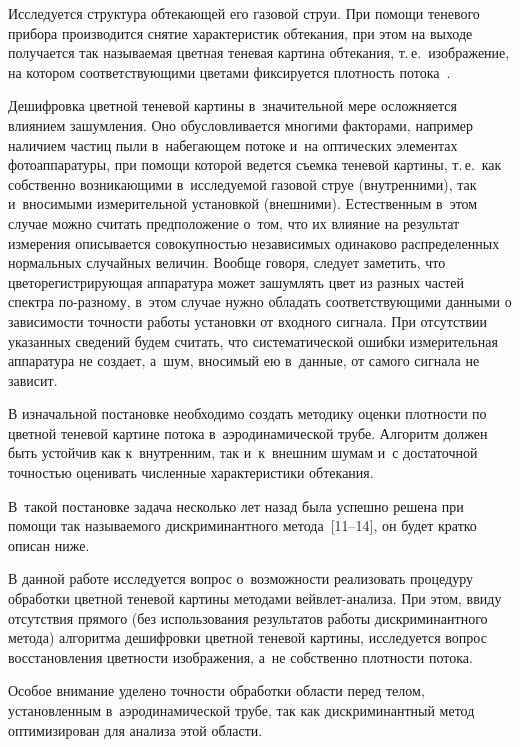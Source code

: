 \begin{multicols}{2}
Исследуется
структура обтекающей его газовой струи. При помощи теневого прибора
производится снятие характеристик обтекания, при этом на выходе
получается так называемая цветная теневая картина обтекания, т.\,е.\
изображение, на котором соответствующими цветами фиксируется
плотность потока~\cite{holder,krasnov,Eng_dis_m, Rus_dis_m}.

Дешифровка цветной теневой картины в~значительной мере осложняется
влиянием зашумления. Оно обусловливается многими факторами, например
наличием частиц пыли в~набегающем потоке и~на оптических элементах
фотоаппаратуры, при помощи которой ведется съемка теневой картины,
т.\,е.\ как собственно возникающими в~исследуемой газовой струе
(внутренними), так и~вносимыми измерительной установкой (внешними).
Естественным в~этом случае можно считать предположение о~том, что
их влияние на результат измерения описывается совокупностью
независимых одинаково распределенных  нормальных случайных величин.
Вообще говоря, следует заметить, что цветорегистрирующая аппаратура
может зашумлять цвет из разных частей спектра по-разному, в~этом
случае нужно обладать соответствующими данными о зависимости
точности работы установки от входного сигнала. При отсутствии
указанных сведений будем считать, что систематической ошибки
измерительная аппаратура не создает, а~шум, вносимый ею в~данные, от
самого сигнала не зависит.

В изначальной постановке необходимо создать методику оценки
плотности по цветной теневой картине потока в~аэродинамической
трубе. Алгоритм должен быть устойчив как к~внутренним, так 
и~к~внешним шумам и~с достаточной точностью оценивать численные
характеристики обтекания. 
{

}

В~такой постановке задача несколько лет
назад была успешно решена при помощи так называемого дискриминантного метода~[11--14], 
он будет кратко описан ниже.

В данной работе исследуется вопрос о~возможности реализовать
процедуру обработки цветной теневой картины методами
вейв\-лет-ана\-ли\-за. При этом, ввиду отсутствия прямого (без
использования результатов работы дискриминантного метода) алгоритма
дешифровки цветной теневой картины, исследуется вопрос
восстановления цветности изоб\-ра\-же\-ния, а~не собственно плотности
потока. 

Особое внимание уделено точности обработки об\-ласти перед
телом, установленным в~аэродинамической трубе, так как дискриминантный
метод оптимизирован для анализа этой об\-ласти.




\end{multicols}
